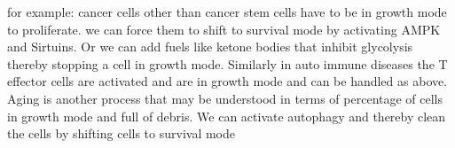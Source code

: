 for example: cancer cells other than cancer stem cells have to be in growth mode to proliferate. we can force them to shift to survival mode by activating AMPK and Sirtuins. Or we can add fuels like ketone bodies that inhibit glycolysis thereby stopping a cell in growth mode. Similarly in auto immune diseases the T effector cells are activated and are in growth mode and can be handled as above. Aging is another process that may be understood in terms of percentage of cells in growth mode and full of debris. We can activate autophagy and thereby clean the cells by shifting cells to survival mode